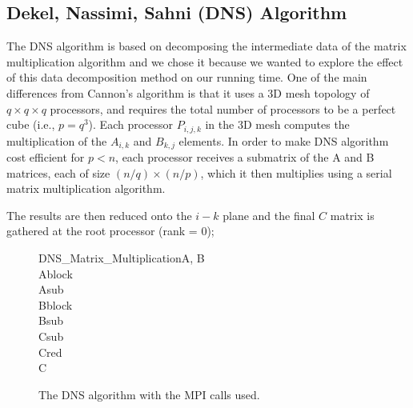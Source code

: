 \documentclass{article}
\begin{document}
\subsection{Dekel, Nassimi, Sahni (DNS) Algorithm}

The DNS algorithm is based on decomposing the intermediate data of the matrix
multiplication algorithm and we chose it because we wanted to explore the effect
of this data decomposition method on our running time. One of the main
differences from Cannon's algorithm is that it uses a 3D mesh topology of $q \times q \times q$ processors, and
requires the total number of processors to be a perfect cube (i.e., $p = q^3$). Each
processor $P_{i,j,k}$ in the 3D mesh computes the multiplication of the
$A_{i,k}$ and $B_{k,j}$ elements.  In order to make DNS algorithm cost efficient
for $p < n$, each processor receives a submatrix of the A and B matrices, each
of size $(n/q) \times (n/p)$, which it then multiplies using a serial matrix
multiplication algorithm.

The results are then reduced onto the $i-k$ plane and the final $C$ matrix is
gathered at the root processor (rank = 0);

\begin{figure}

\begin{pseudocode}[ruled]{DNS\_Matrix\_Multiplication}{A, B}
 \vspace{10pt} \\

Ablock \GETS {} \\
Asub \GETS {} \vspace{10pt} \\

Bblock \GETS {} \\
Bsub \GETS {} \vspace{10pt} \\

Csub \GETS {} \vspace{10pt} \\

Cred \GETS {} \\
C \GETS {} \vspace{10pt} \\

\end{pseudocode}
\caption{The DNS algorithm with the MPI calls used.}
\end{figure}
\end{document}
